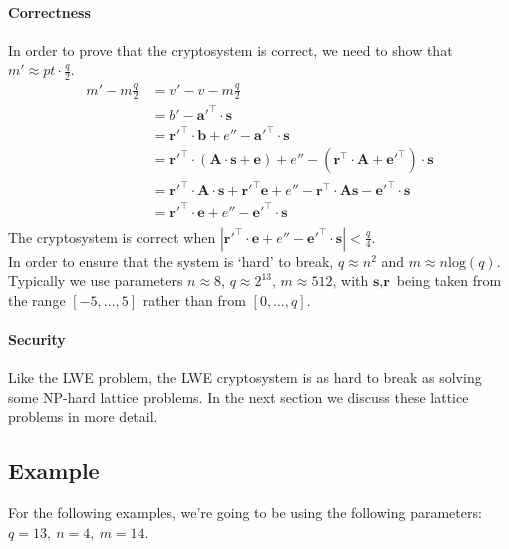\documentclass[a4paper, 11pt, openany]{book}
\numberwithin{equation}{section}
\theoremstyle{plain}
\theoremstyle{definition}
\begin{document}
\paragraph{Correctness} In order to prove that the cryptosystem is correct, we need to show that $m' \approx pt\cdot\frac{q}{2}$.
\begin{align*}
m'- m\frac{q}{2} & = v' - v - m\frac{q}{2} \\
& = b' - \textbf{a}'^{\top}\cdot\textbf{s} \\
& = \textbf{r}'^{\top}\cdot\textbf{b} + e'' - \textbf{a}'^{\top}\cdot\textbf{s} \\
& = \textbf{r}'^{\top}\cdot(\textbf{A}\cdot \textbf{s}+\textbf{e}) + e'' - (\textbf{r}^{\top}\cdot\textbf{A} + \textbf{e}'^{\top})\cdot\textbf{s} \\
& = \textbf{r}'^{\top}\cdot\textbf{A}\cdot \textbf{s}+\textbf{r}'^{\top}\textbf{e}+ e'' -\textbf{r}^{\top}\cdot\textbf{A}\textbf{s} - \textbf{e}'^{\top}\cdot\textbf{s} \\
& = \textbf{r}'^{\top}\cdot\textbf{e} + e'' - \textbf{e}'^{\top}\cdot\textbf{s} \\
\end{align*}
The cryptosystem is correct when $|\textbf{r}'^{\top}\cdot\textbf{e} + e'' - \textbf{e}'^{\top}\cdot\textbf{s}| < \frac{q}{4}$.
\\
In order to ensure that the system is `hard' to break, $q \approx n^2$ and $m \approx n\text{log}(q)$. Typically we use parameters $n \approx 8$, $q\approx 2^{13}$, $m\approx 512$, with $\textbf{s}, \textbf{r}$ being taken from the range $[-5, \ldots ,5]$ rather than from $[0, \ldots ,q]$.
\paragraph{Security} Like the LWE problem, the LWE cryptosystem is as hard to break as solving some NP-hard lattice problems. In the next section we discuss these lattice problems in more detail.
\subsection{Example}
For the following examples, we're going to be using the following parameters: $q = 13,~ n=4,~ m=14$. 
\end{document}
